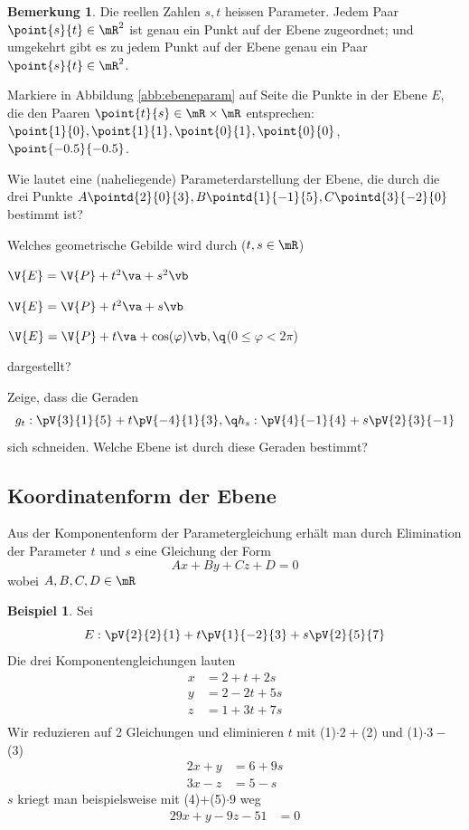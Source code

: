 \documentclass[%
11pt,%
twoside,%
titlepage,%
german,%
headsepline%
]{scrartcl}
\theoremstyle{definition}
\newtheorem{bsp}{Beispiel}[subsection] %
\newtheorem{bem}{Bemerkung}[subsection] %
\theoremstyle{plain}
\begin{document}
\begin{bem}
Die reellen Zahlen $s,t$ heissen Parameter. Jedem Paar $\point{s}{t}\in\mR^2$ ist genau ein Punkt auf der Ebene zugeordnet; und umgekehrt gibt es zu jedem Punkt auf der Ebene genau ein Paar $\point{s}{t}\in\mR^2$.
\end{bem}

\begin{ueb}
Markiere in Abbildung \ref{abb:ebeneparam} auf Seite \pageref{abb:ebeneparam} die Punkte in der Ebene $E$, die den Paaren $\point{t}{s} \in \mR \times \mR$ entsprechen: $\point{1}{0},\point{1}{1}, \point{0}{1},\point{0}{0}$, $\point{-0.5}{-0.5}$.
\end{ueb}

\begin{ueb}[Parameterform]
Wie lautet eine (naheliegende) Parameterdarstellung der Ebene, die durch die drei Punkte $A\pointd{2}{0}{3}, B\pointd{1}{- 1}{5}, C\pointd{3}{- 2}{0}$ bestimmt ist?
\end{ueb}

\begin{ueb}
Welches geometrische Gebilde wird durch ($t,s \in \mR$)
\begin{enumeratea}
\item $\V{E}=\V{P}+t^2\va+s^2\vb$
\item $\V{E}=\V{P}+t^2\va+s\vb$
\item $\V{E}=\V{P}+t\va+\cos(\varphi)\vb,\q$($0\leq\varphi<2\pi$)
\end{enumeratea}
dargestellt?
\end{ueb}

\begin{ueb}[Geraden]
Zeige, dass die Geraden
$$g_t:\pV{3}{1}{5}+t\pV{-4}{1}{3},\q h_s:\pV{4}{-1}{4}+s\pV{2}{3}{-1}$$
sich schneiden. Welche Ebene ist durch diese Geraden bestimmt?
\end{ueb}

\subsection{Koordinatenform der Ebene}
Aus der Komponentenform der Parametergleichung erhält man durch Elimination der Parameter $t$ und $s$ eine Gleichung der Form
$$Ax+By+Cz+D=0$$
wobei $A,B,C,D\in\mR$

\begin{bsp}
Sei
$$E: \pV{2}{2}{1}+t\pV{1}{-2}{3}+s\pV{2}{5}{7}$$
Die drei Komponentengleichungen lauten
\begin{align*}
x&=2+t+2s\tag{1}\\
y&=2-2t+5s\tag{2}\\
z&=1+3t+7s\tag{3}\\
\end{align*}
Wir reduzieren auf 2 Gleichungen und eliminieren $t$ mit (1)$\cdot2+$(2) und (1)$\cdot3-$(3)
\begin{align*}
2x+y&=6+9s\tag{4}\\
3x-z&=5-s\tag{5}
\end{align*}
$s$ kriegt man beispielsweise mit (4)$+$(5)$\cdot9$ weg
\begin{align*}
29x+y-9z-51&=0
\end{align*}
\end{bsp}
\end{document}
